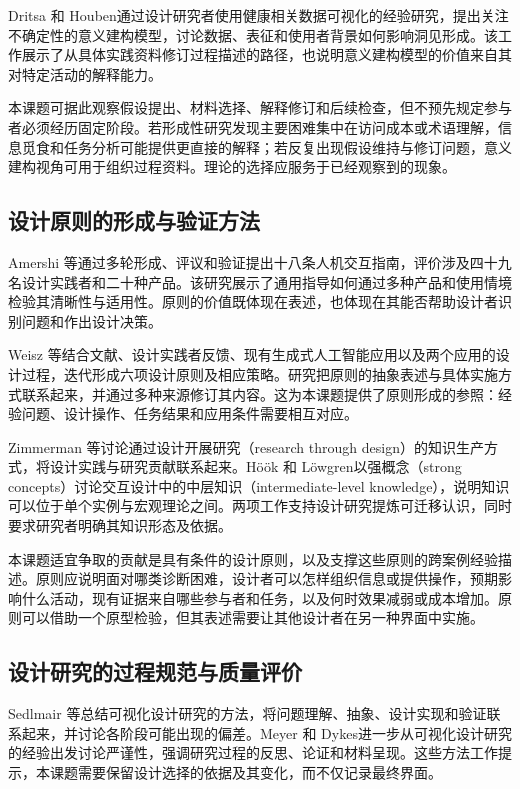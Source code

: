 Dritsa 和 Houben\cite{ref57}通过设计研究者使用健康相关数据可视化的经验研究，提出关注不确定性的意义建构模型，讨论数据、表征和使用者背景如何影响洞见形成。该工作展示了从具体实践资料修订过程描述的路径，也说明意义建构模型的价值来自其对特定活动的解释能力。

本课题可据此观察假设提出、材料选择、解释修订和后续检查，但不预先规定参与者必须经历固定阶段。若形成性研究发现主要困难集中在访问成本或术语理解，信息觅食和任务分析可能提供更直接的解释；若反复出现假设维持与修订问题，意义建构视角可用于组织过程资料。理论的选择应服务于已经观察到的现象。

\subsection{设计原则的形成与验证方法}

Amershi 等\cite{ref48}通过多轮形成、评议和验证提出十八条人机交互指南，评价涉及四十九名设计实践者和二十种产品。该研究展示了通用指导如何通过多种产品和使用情境检验其清晰性与适用性。原则的价值既体现在表述，也体现在其能否帮助设计者识别问题和作出设计决策。

Weisz 等\cite{ref66}结合文献、设计实践者反馈、现有生成式人工智能应用以及两个应用的设计过程，迭代形成六项设计原则及相应策略。研究把原则的抽象表述与具体实施方式联系起来，并通过多种来源修订其内容。这为本课题提供了原则形成的参照：经验问题、设计操作、任务结果和应用条件需要相互对应。

Zimmerman 等\cite{zimmerman2007rtd}讨论通过设计开展研究（research through design）的知识生产方式，将设计实践与研究贡献联系起来。Höök 和 Löwgren\cite{hook2012strong}以强概念（strong concepts）讨论交互设计中的中层知识（intermediate-level knowledge），说明知识可以位于单个实例与宏观理论之间。两项工作支持设计研究提炼可迁移认识，同时要求研究者明确其知识形态及依据。

本课题适宜争取的贡献是具有条件的设计原则，以及支撑这些原则的跨案例经验描述。原则应说明面对哪类诊断困难，设计者可以怎样组织信息或提供操作，预期影响什么活动，现有证据来自哪些参与者和任务，以及何时效果减弱或成本增加。原则可以借助一个原型检验，但其表述需要让其他设计者在另一种界面中实施。

\subsection{设计研究的过程规范与质量评价}

Sedlmair 等\cite{sedlmair2012design}总结可视化设计研究的方法，将问题理解、抽象、设计实现和验证联系起来，并讨论各阶段可能出现的偏差。Meyer 和 Dykes\cite{meyer2020rigor}进一步从可视化设计研究的经验出发讨论严谨性，强调研究过程的反思、论证和材料呈现。这些方法工作提示，本课题需要保留设计选择的依据及其变化，而不仅记录最终界面。

